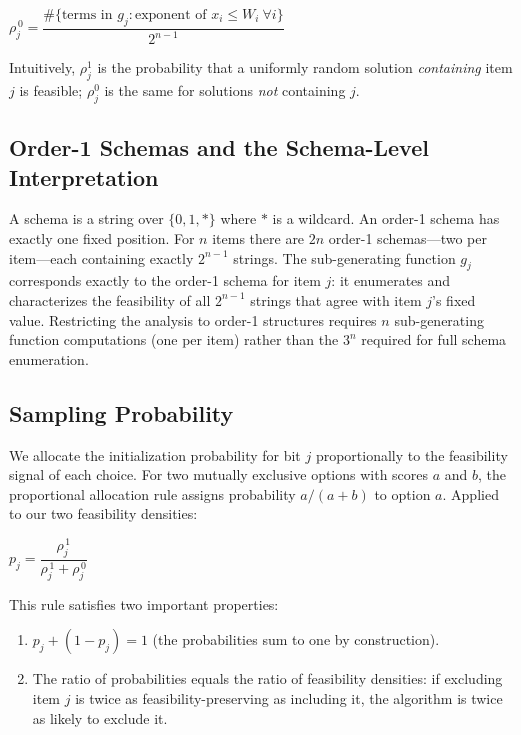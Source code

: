 \documentclass[twocolumn]{article}
\begin{document}
\begin{flushleft}
\hspace{2em}$\rho_{j}^{\,0} = \dfrac{\#\bigl\{\text{terms in } 
g_j : \text{exponent of } 
x_i \leq W_i \ \forall i\bigr\}}{2^{n-1}}$
\end{flushleft}

Intuitively, $\rho_j^1$ is the probability that a uniformly random 
solution \textit{containing} item $j$ is feasible; $\rho_j^0$ is the 
same for solutions \textit{not} containing $j$.

\subsection{Order-1 Schemas and the Schema-Level Interpretation}

A schema is a string over $\{0, 1, *\}$ where $*$ is a wildcard. An 
order-1 schema has exactly one fixed position. For $n$ items there are 
$2n$ order-1 schemas---two per item---each containing exactly $2^{n-1}$ 
strings. The sub-generating function $g_j$ corresponds exactly to the 
order-1 schema for item $j$: it enumerates and characterizes the 
feasibility of all $2^{n-1}$ strings that agree with item $j$'s fixed 
value. Restricting the analysis to order-1 structures requires $n$ 
sub-generating function computations (one per item) rather than the $3^n$ 
required for full schema enumeration.

\subsection{Sampling Probability}
\label{sec:samplingprob}

We allocate the initialization probability for bit $j$ proportionally to 
the feasibility signal of each choice. For two mutually exclusive options 
with scores $a$ and $b$, the proportional allocation rule assigns 
probability $a/(a+b)$ to option $a$. Applied to our two feasibility 
densities:

\begin{flushleft}
\hspace{2em}$p_j = \dfrac{\rho_{j}^{\,1}}{\rho_{j}^{\,1} + \rho_{j}^{\,0}}$
\end{flushleft}

This rule satisfies two important properties:
\begin{enumerate}
    \item $p_j + (1 - p_j) = 1$ (the probabilities sum to one by 
    construction).
    \item The ratio of probabilities equals the ratio of feasibility 
    densities: if excluding item $j$ is twice as feasibility-preserving 
    as including it, the algorithm is twice as likely to exclude it.
\end{enumerate}
\end{document}
